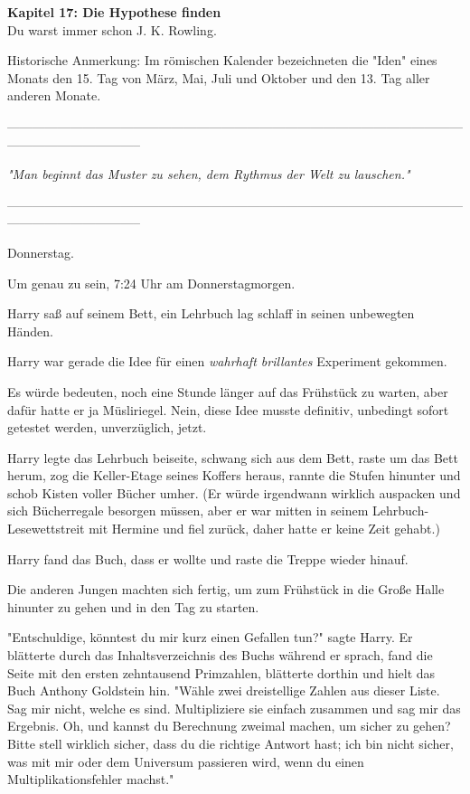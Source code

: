 

\hypertarget{die-hypothese-finden}{%

\textbf{Kapitel 17: Die Hypothese finden}\\

Du warst immer schon J. K. Rowling.

Historische Anmerkung: Im römischen Kalender bezeichneten die "Iden" eines Monats den 15. Tag von März, Mai, Juli und Oktober und den 13. Tag aller anderen Monate.

--------------------------------------------------------------------------------------------------------------------------------------------

\emph{"Man beginnt das Muster zu sehen, dem Rythmus der Welt zu lauschen."}

--------------------------------------------------------------------------------------------------------------------------------------------

Donnerstag.

Um genau zu sein, 7:24 Uhr am Donnerstagmorgen.

Harry saß auf seinem Bett, ein Lehrbuch lag schlaff in seinen unbewegten Händen.

Harry war gerade die Idee für einen \emph{wahrhaft brillantes} Experiment gekommen.

Es würde bedeuten, noch eine Stunde länger auf das Frühstück zu warten, aber dafür hatte er ja Müsliriegel. Nein, diese Idee musste definitiv, unbedingt sofort getestet werden, unverzüglich, jetzt.

Harry legte das Lehrbuch beiseite, schwang sich aus dem Bett, raste um das Bett herum, zog die Keller-Etage seines Koffers heraus, rannte die Stufen hinunter und schob Kisten voller Bücher umher. (Er würde irgendwann wirklich auspacken und sich Bücherregale besorgen müssen, aber er war mitten in seinem Lehrbuch-Lesewettstreit mit Hermine und fiel zurück, daher hatte er keine Zeit gehabt.)

Harry fand das Buch, dass er wollte und raste die Treppe wieder hinauf.

Die anderen Jungen machten sich fertig, um zum Frühstück in die Große Halle hinunter zu gehen und in den Tag zu starten.

"Entschuldige, könntest du mir kurz einen Gefallen tun?" sagte Harry. Er blätterte durch das Inhaltsverzeichnis des Buchs während er sprach, fand die Seite mit den ersten zehntausend Primzahlen, blätterte dorthin und hielt das Buch Anthony Goldstein hin. "Wähle zwei dreistellige Zahlen aus dieser Liste. Sag mir nicht, welche es sind. Multipliziere sie einfach zusammen und sag mir das Ergebnis. Oh, und kannst du Berechnung zweimal machen, um sicher zu gehen? Bitte stell wirklich sicher, dass du die richtige Antwort hast; ich bin nicht sicher, was mit mir oder dem Universum passieren wird, wenn du einen Multiplikationsfehler machst."

}
